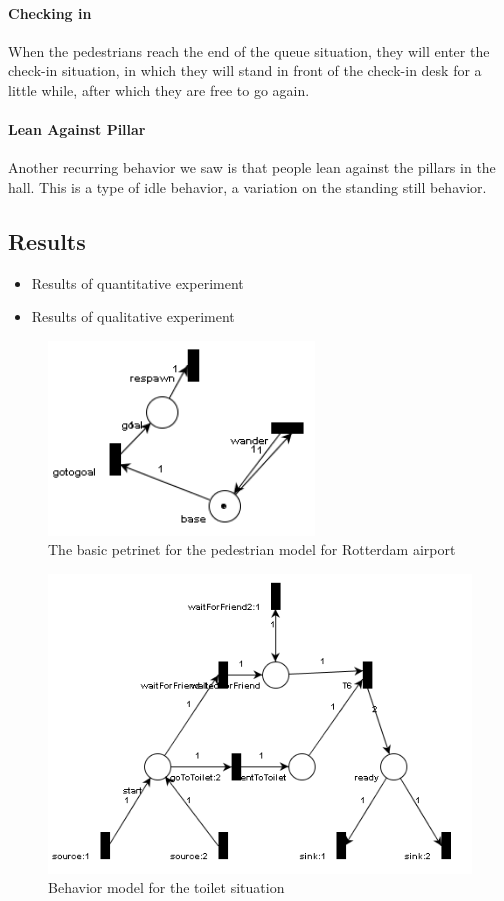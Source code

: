 \documentclass[11pt]{article}
\begin{document}
\paragraph{Checking in}
When the pedestrians reach the end of the queue situation, they will enter the check-in situation, in which they will stand in front of the check-in desk for a little while, after which they are free to go again.

\paragraph{Lean Against Pillar}
Another recurring behavior we saw is that people lean against the pillars in the hall. This is a type of idle behavior, a variation on the standing still behavior.

\subsection{Results}


\begin{itemize}
\item Results of quantitative experiment

\item Results of qualitative experiment
\end{itemize}



\begin{figure}
\centering
\includegraphics[width=200pt]{rotterdamPedestrianNet}
\caption{The basic petrinet for the pedestrian model for Rotterdam airport}
\label{basicnet}
\end{figure}

\begin{figure}
\centering
\includegraphics[width=350pt]{twoPeopleToiletSituation}
\caption{Behavior model for the toilet situation}
\label{toiletsituation}
\end{figure}
\end{document}
